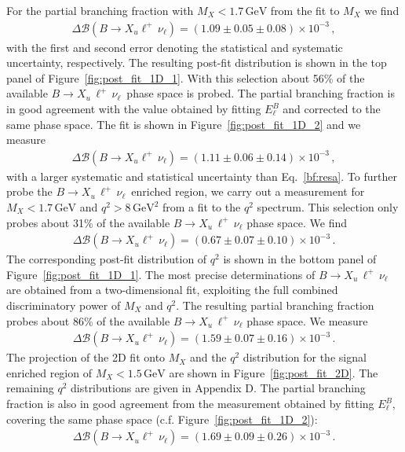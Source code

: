 \documentclass[twocolumn,aps,prd,superscriptaddress,nofootinbib,floatfix,preprintnumbers,a4]{revtex4-1}
\newcommand{\bfResa}{\ensuremath{\Delta \mathcal{B}(B \to X_u \ell^+ \, \nu_\ell) = \left( 1.09 \pm 0.05  \pm 0.08 \right) \times 10^{-3}}\xspace}
\newcommand{\bfResb}{\ensuremath{\Delta \mathcal{B}(B \to X_u \ell^+ \, \nu_\ell) = \left( 0.67 \pm 0.07  \pm 0.10 \right) \times 10^{-3}}\xspace}
\newcommand{\bfRescp}{\ensuremath{\Delta \mathcal{B}(B \to X_u \ell^+ \, \nu_\ell) = \left( 1.11 \pm 0.06  \pm 0.14 \right) \times 10^{-3}}\xspace}
\newcommand{\bfResc}{\ensuremath{\Delta \mathcal{B}(B \to X_u \ell^+ \, \nu_\ell) = \left( 1.69 \pm 0.09  \pm 0.26 \right) \times 10^{-3}}\xspace}
\newcommand{\bfResd}{\ensuremath{\Delta \mathcal{B}(B \to X_u \ell^+ \, \nu_\ell) = \left( 1.59 \pm 0.07  \pm 0.16 \right) \times 10^{-3}}\xspace}
\newcommand{\bulnu}{\ensuremath{B \to X_u \, \ell^+\, \nu_{\ell}}\xspace}
\begin{document}
For the partial branching fraction with $M_X < 1.7 \, \text{GeV}$ from the fit to $M_X$ we find
\begin{align} \label{bf:resa}
\bfResa \, ,
\end{align}
with the first and second error denoting the statistical and systematic uncertainty, respectively. The resulting post-fit distribution is shown in the top panel of Figure~\ref{fig:post_fit_1D_1}. With this selection about 56\% of the available \bulnu\ phase space is probed. The partial branching fraction is in good agreement with the value obtained by fitting $E_\ell^B$ and corrected to the same phase space. The fit is shown in Figure~\ref{fig:post_fit_1D_2} and we measure
\begin{align}
\bfRescp \, ,
\end{align}
with a larger systematic and statistical uncertainty than Eq.~\ref{bf:resa}. 
To further probe the \bulnu\, enriched region, we carry out a measurement for $M_X < 1.7 \, \text{GeV}$ and $q^2 > 8 \, \text{GeV}^2$ from a fit to the $q^2$ spectrum. This selection only probes about 31\% of the available \bulnu phase space. We find
\begin{align}
\bfResb \, .
\end{align}
The corresponding post-fit distribution of $q^2$ is shown in the bottom panel of Figure~\ref{fig:post_fit_1D_1}.
The most precise determinations of \bulnu are obtained from a two-dimensional fit, exploiting the full combined discriminatory power of $M_X$ and $q^2$. The resulting partial branching fraction probes about 86\% of the available \bulnu phase space. We measure 
\begin{align} \label{eq:bfResD}
\bfResd \, .
\end{align}
The projection of the 2D fit onto $M_X$ and the $q^2$ distribution for the signal enriched region of $M_X < 1.5 \, \mathrm{GeV}$ are shown in Figure~\ref{fig:post_fit_2D}. The remaining $q^2$ distributions are given in Appendix D. The partial branching fraction is also in good agreement from the measurement obtained by fitting $E_\ell^B$, covering the same phase space (c.f. Figure~\ref{fig:post_fit_1D_2}):
\begin{align}
\bfResc \, .
\end{align}
\end{document}
